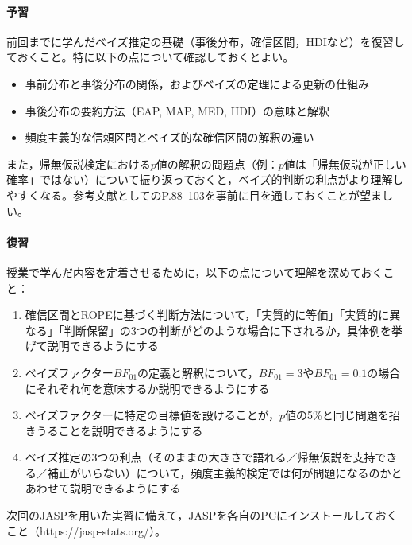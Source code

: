 \paragraph{予習}
前回までに学んだベイズ推定の基礎（事後分布，確信区間，HDIなど）を復習しておくこと。特に以下の点について確認しておくとよい。
\begin{itemize}
  \item 事前分布と事後分布の関係，およびベイズの定理による更新の仕組み
  \item 事後分布の要約方法（EAP, MAP, MED, HDI）の意味と解釈
  \item 頻度主義的な信頼区間とベイズ的な確信区間の解釈の違い
\end{itemize}
また，帰無仮説検定における$p$値の解釈の問題点（例：$p$値は「帰無仮説が正しい確率」ではない）について振り返っておくと，ベイズ的判断の利点がより理解しやすくなる。参考文献として\textcite{Lee201709}のP.88--103を事前に目を通しておくことが望ましい。

\paragraph{復習}
授業で学んだ内容を定着させるために，以下の点について理解を深めておくこと：
\begin{enumerate}
  \item 確信区間とROPEに基づく判断方法について，「実質的に等価」「実質的に異なる」「判断保留」の3つの判断がどのような場合に下されるか，具体例を挙げて説明できるようにする
  \item ベイズファクター$BF_{01}$の定義と解釈について，$BF_{01}=3$や$BF_{01}=0.1$の場合にそれぞれ何を意味するか説明できるようにする 
  \item ベイズファクターに特定の目標値を設けることが，$p$値の5\%と同じ問題を招きうることを説明できるようにする
  \item ベイズ推定の3つの利点（そのままの大きさで語れる／帰無仮説を支持できる／補正がいらない）について，頻度主義的検定では何が問題になるのかとあわせて説明できるようにする
\end{enumerate}
次回のJASPを用いた実習に備えて，JASPを各自のPCにインストールしておくこと（https://jasp-stats.org/）。
